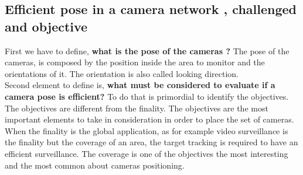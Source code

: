 \subsection{Efficient pose in a camera network , challenged and objective}
First we have to define,\textbf{ what is the pose of the cameras ? }
The pose of the cameras, is composed by the position inside the area to monitor and the orientations of it. The orientation is also called looking direction.\\ 
 Second element to define is, \textbf{what must be considered to evaluate if a camera pose is efficient?} To do that is primordial to identify the objectives. The objectives are different from the finality. The objectives are the most important elements to take in consideration in order to place the set of cameras. When the finality is the global application, as for example video surveillance is the finality but the coverage of an area, the target tracking is required to have an efficient surveillance. The coverage is one of the objectives the most interesting and the most common about cameras positioning.



